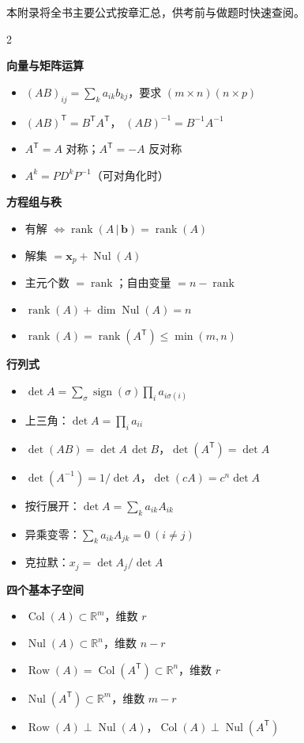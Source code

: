 \documentclass[11pt,a4paper,openany]{ctexbook}
\DeclareMathOperator{\rank}{rank}
\DeclareMathOperator{\Col}{Col}
\DeclareMathOperator{\Nul}{Nul}
\DeclareMathOperator{\Row}{Row}
\DeclareMathOperator{\sign}{sign}
\newcommand{\Rnum}[1]{\mathbb{R}^{#1}}
\newcommand{\minihead}[1]{%
  \par\addvspace{8pt}%
  {\noindent\sffamily\bfseries\large\color{qing} #1\par}%
  \vspace{-4pt}\noindent{\color{qing!28}\rule{\linewidth}{0.6pt}}\par\vspace{5pt}}
\begin{document}
\begin{center}
{\small\sffamily\color{inkl}本附录将全书主要公式按章汇总，供考前与做题时快速查阅。}
\end{center}

\begin{multicols}{2}
\small\sloppy
{}

\minihead{向量与矩阵运算}
\begin{itemize}[leftmargin=1.4em, itemsep=2pt]
\item $(AB)_{ij}=\sum_k a_{ik}b_{kj}$，要求 $(m\times n)(n\times p)$
\item $(AB)^{\mathsf T}=B^{\mathsf T}A^{\mathsf T}$，
      $(AB)^{-1}=B^{-1}A^{-1}$
\item $A^{\mathsf T}=A$ 对称；$A^{\mathsf T}=-A$ 反对称
\item $A^k=PD^kP^{-1}$（可对角化时）
\end{itemize}

\minihead{方程组与秩}
\begin{itemize}[leftmargin=1.4em, itemsep=2pt]
\item 有解 $\Leftrightarrow \rank(A\,|\,\boldsymbol{b})=\rank(A)$
\item 解集 $=\boldsymbol{x}_p+\Nul(A)$
\item 主元个数 $=\rank$；自由变量 $=n-\rank$
\item $\rank(A)+\dim\Nul(A)=n$
\item $\rank(A)=\rank(A^{\mathsf T})\le\min(m,n)$
\end{itemize}

\minihead{行列式}
\begin{itemize}[leftmargin=1.4em, itemsep=2pt]
\item $\det A=\sum_{\sigma}\sign(\sigma)\prod_i a_{i\sigma(i)}$
\item 上三角：$\det A=\prod_i a_{ii}$
\item $\det(AB)=\det A\,\det B$，$\det(A^{\mathsf T})=\det A$
\item $\det(A^{-1})=1/\det A$，$\det(cA)=c^n\det A$
\item 按行展开：$\det A=\sum_k a_{ik}A_{ik}$
\item 异乘变零：$\sum_k a_{ik}A_{jk}=0\ (i\neq j)$
\item 克拉默：$x_j=\det A_j/\det A$
\end{itemize}

\minihead{四个基本子空间}
\begin{itemize}[leftmargin=1.4em, itemsep=2pt]
\item $\Col(A)\subset\Rnum{m}$，维数 $r$
\item $\Nul(A)\subset\Rnum{n}$，维数 $n-r$
\item $\Row(A)=\Col(A^{\mathsf T})\subset\Rnum{n}$，维数 $r$
\item $\Nul(A^{\mathsf T})\subset\Rnum{m}$，维数 $m-r$
\item $\Row(A)\perp\Nul(A)$，$\Col(A)\perp\Nul(A^{\mathsf T})$
\end{itemize}


\end{multicols}
\end{document}
